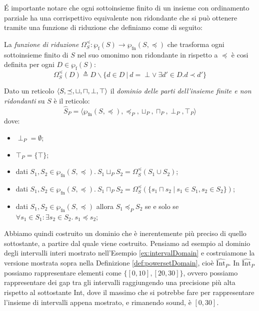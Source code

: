 \'E importante notare che ogni sottoinsieme finito di un insieme con ordinamento parziale ha una corrispettivo equivalente non ridondante che si può ottenere tramite una funzione di riduzione che definiamo come di seguito:

\begin{definition}\label{def:funzioneRiduzione}
La \textit{funzione di riduzione} \(\Omega_{S}^{\preceq} : \wp_{\textrm{f}}(S)\rightarrow\wp_{\textrm{fn}}(S, \preceq)\) che trasforma ogni sottoinsieme finito di \(S\) nel suo omonimo non ridondante in rispetto a \(\preceq\) è cosi definita per ogni \(D\in\wp_{\textrm{f}}(S)\):
\[\Omega_{S}^{\preceq}(D) \triangleq D \backslash \lbrace d \in D     \ \vert\ d= \perp \vee\ \exists d'\in D . d\prec d' \rbrace\]
\end{definition}

\begin{definition}\label{def:powersetDomain}
Dato un reticolo \(\langle S, \preceq,\sqcup, \sqcap, \perp, \top\rangle\) il \textit{dominio delle parti dell'insieme finite e non ridondanti} su \(S\) è il reticolo:
\[\hat{S}_P = \langle \wp_{\textrm{fn}}(S, \preceq),\preceq_P, \sqcup_P, \sqcap_P, \perp_P, \top_P \rangle\]
dove:
\begin{itemize}
	\item \(\perp_P=\emptyset\);
	\item \(\top_P=\{\top\}\);
	\item dati \(S_1, S_2\in\wp_{\textrm{fn}}(S, \preceq).\ S_1 \sqcup_P S_2 = \Omega_{S}^{\preceq}(S_1 \cup S_2)\);
	\item dati \(S_1, S_2\in\wp_{\textrm{fn}}(S, \preceq).\ S_1 \sqcap_P S_2 = \Omega_{S}^{\preceq}(\{s_1 \sqcap s_2\ |\ s_1\in S_1, s_2\in S_2\})\);
	\item dati \(S_1, S_2\in\wp_{\textrm{fn}}(S, \preceq)\) allora \(S_1 \preceq_P S_2\) se e solo se \(\forall s_1 \in S_1 : \exists s_2 \in S_2.\ s_1\preceq s_2\);
\end{itemize}
\end{definition}

Abbiamo quindi costruito un dominio che è inerentemente più preciso di quello sottostante, a partire dal quale viene costruito. Pensiamo ad esempio al dominio degli intervalli interi mostrato nell'Esempio \ref{ex:intervalDomain} e costruiamone la versione mostrata sopra nella Definizione \ref{def:powersetDomain}, cioè \(\hat{\textrm{Int}}_P\). In \(\hat{\textrm{Int}}_P\) possiamo rappresentare elementi come \(\{[0, 10], [20, 30]\}\), ovvero possiamo rappresentare dei gap tra gli intervalli raggiungendo una precisione più alta rispetto al sottostante Int, dove il massimo che si potrebbe fare per rappresentare l'insieme di intervalli appena mostrato, e rimanendo sound, è \([0, 30]\).

